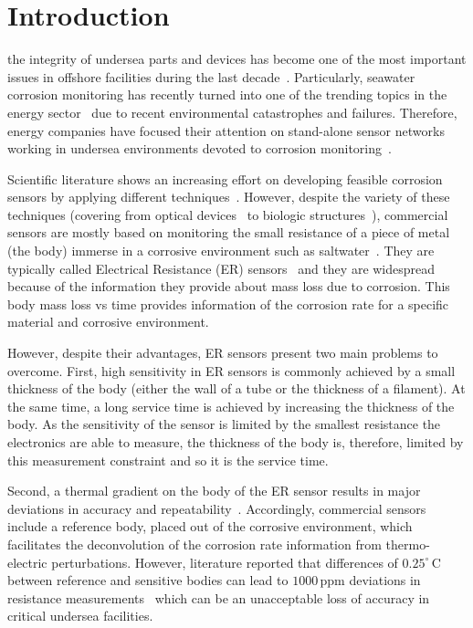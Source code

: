 \documentclass[journal,twoside,web]{ieeecolor}
\begin{document}
\maketitle

\section{Introduction}
\label{sec:intro}
 the integrity of undersea parts and devices has become one of the most important issues in offshore facilities during the last decade~\cite{yang2018, coelho2017, islam2015, singh2014, yasri2014, diler2014, yu2010}. Particularly,  seawater corrosion monitoring has recently turned into one of the trending topics in the energy sector~\cite{zakowski2014, alcantara2017} due to recent environmental catastrophes and failures. Therefore, energy companies have focused their attention on stand-alone sensor networks working in undersea environments devoted to corrosion monitoring~\cite{martinez2016, johny2016, beganovic2015, agarwal2014,xu2014}.


Scientific literature shows an increasing effort on developing feasible corrosion sensors by applying different techniques~\cite{wright2019}. However, despite the variety of these techniques (covering from optical devices~\cite{coelho2017,islam2015} to biologic structures~\cite{diler2014}),
commercial sensors are mostly based on monitoring the small resistance of a piece of metal (the body) immerse in a corrosive environment such as saltwater~\cite{prosek2014}. They are typically called Electrical Resistance (ER) sensors~\cite{mcKenzie1985} and they are widespread because of the information they provide about mass loss due to corrosion. This body mass loss vs time provides information of the corrosion rate for a specific material and corrosive environment.

However, despite their advantages, ER sensors present two main problems to overcome. First, high sensitivity in ER sensors is commonly achieved by a small thickness of the body (either the wall of a tube or the thickness of a filament). At the same time, a long service time is achieved by increasing the thickness of the body. As the sensitivity of the sensor is limited by the smallest resistance the electronics are able to measure, the thickness of the body is, therefore, limited by this measurement constraint and so it is the service time.

Second, a thermal gradient on the body of the ER sensor results in major deviations in accuracy and repeatability~\cite{reilly2018, corres2014, cross2011}.
Accordingly, commercial sensors include a reference body, placed out of the corrosive environment, which facilitates the deconvolution of the corrosion rate information from thermo-electric perturbations. However, literature reported that differences of $0.25^{\circ}$\,C between reference and sensitive bodies can lead to $1000$\,ppm deviations in resistance measurements~\cite{rhoades1986,p_rhoades1980,hilbert2006} which can be an unacceptable loss of accuracy in critical undersea facilities.
\end{document}
